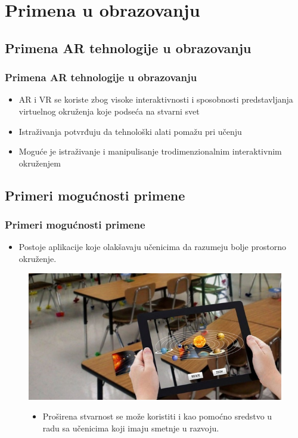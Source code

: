 \documentclass[9pt]{beamer}
\begin{document}
 
\section{Primena u obrazovanju}
\subsection{Primena AR  tehnologije u obrazovanju}
	\begin{frame} 
 \frametitle{Primena AR  tehnologije u obrazovanju}
    \begin{itemize}
    \setlength\itemsep{1.5em}
            \item AR i VR se koriste zbog visoke interaktivnosti i sposobnosti predstavljanja virtuelnog okruženja koje podseća na stvarni svet
            \item Istraživanja potvrđuju da tehnološki alati pomažu pri učenju
            \item Moguće je istraživanje i manipulisanje trodimenzionalnim interaktivnim okruženjem 
    \end{itemize}
 
	\end{frame}



 
\subsection{Primeri mogućnosti primene}

 \begin{frame}
 \frametitle{Primeri mogućnosti primene}
            \begin{itemize}
            \setlength\itemsep{1.5em}
		\item Postoje aplikacije koje olakšavaju učenicima da razumeju bolje prostorno okruženje. 
            \end{itemize}
            \begin{figure}[h!]
		\begin{center}
		\includegraphics[scale=0.3]{primer.jpg}
		\end{center}
  \begin{itemize}
		\item Proširena stvarnost se može koristiti i kao pomoćno sredstvo u radu sa učenicima koji imaju smetnje u razvoju.
            \end{itemize}
		
		\end{figure}
\end{frame}
\end{document}

